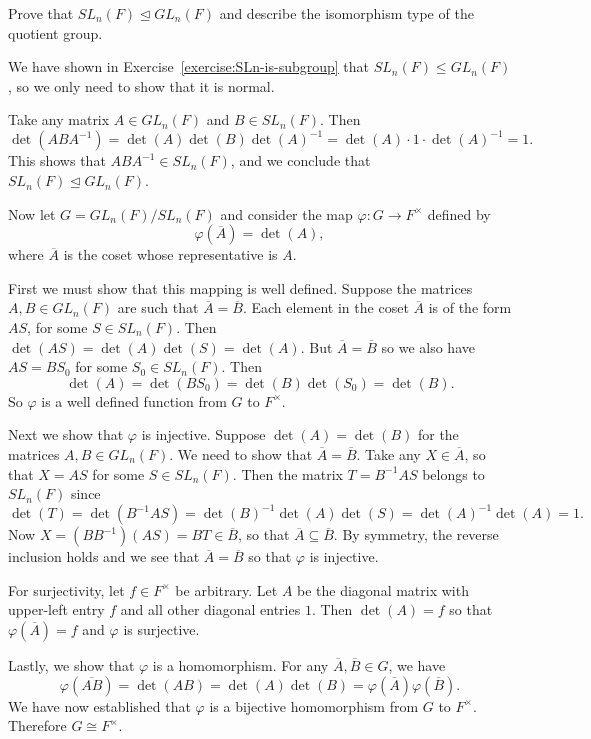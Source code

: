 Prove that $SL_n(F)\trianglelefteq GL_n(F)$ and describe
the isomorphism type of the quotient group.
\begin{solution}
  We have shown in Exercise~\ref{exercise:SLn-is-subgroup} that
  $SL_n(F)\leq GL_n(F)$, so we only need to show that it is normal.

  Take any matrix $A\in GL_n(F)$ and $B\in SL_n(F)$. Then
  \begin{equation*}
    \det(ABA^{-1})
    = \det(A)\det(B)\det(A)^{-1}
    = \det(A)\cdot1\cdot\det(A)^{-1}
    = 1.
  \end{equation*}
  This shows that $ABA^{-1}\in SL_n(F)$, and we conclude that
  $SL_n(F)\trianglelefteq GL_n(F)$.

  Now let $G = GL_n(F)/SL_n(F)$ and consider the map
  $\varphi\colon G\to F^\times$ defined by
  \begin{equation*}
    \varphi(\overline{A}) = \det(A),
  \end{equation*}
  where $\overline{A}$ is the coset whose representative is $A$.

  First we must show that this mapping is well defined. Suppose the
  matrices $A,B\in GL_n(F)$ are such that
  $\overline{A} = \overline{B}$. Each element in the coset
  $\overline{A}$ is of the form $AS$, for some $S\in SL_n(F)$. Then
  $\det(AS) = \det(A)\det(S) = \det(A)$. But
  $\overline{A} = \overline{B}$ so we also have $AS = BS_0$ for some
  $S_0\in SL_n(F)$. Then
  \begin{equation*}
    \det(A) = \det(BS_0) = \det(B)\det(S_0) = \det(B).
  \end{equation*}
  So $\varphi$ is a well defined function from $G$ to $F^\times$.

  Next we show that $\varphi$ is injective. Suppose
  $\det(A) = \det(B)$ for the matrices $A,B\in GL_n(F)$. We need to
  show that $\overline{A} = \overline{B}$. Take any
  $X\in\overline{A}$, so that $X = AS$ for some $S\in SL_n(F)$. Then
  the matrix $T = B^{-1}AS$ belongs to $SL_n(F)$ since
  \begin{equation*}
    \det(T) = \det(B^{-1}AS)
    = \det(B)^{-1}\det(A)\det(S) = \det(A)^{-1}\det(A) = 1.
  \end{equation*}
  Now $X = (BB^{-1})(AS) = BT\in\overline{B}$, so that
  $\overline{A}\subseteq\overline{B}$. By symmetry, the reverse
  inclusion holds and we see that $\overline{A} = \overline{B}$ so
  that $\varphi$ is injective.

  For surjectivity, let $f\in F^\times$ be arbitrary. Let $A$ be the
  diagonal matrix with upper-left entry $f$ and all other diagonal
  entries $1$. Then $\det(A) = f$ so that $\varphi(\overline{A}) = f$
  and $\varphi$ is surjective.

  Lastly, we show that $\varphi$ is a homomorphism. For any
  $\overline{A},\overline{B}\in G$, we have
  \begin{equation*}
    \varphi(\overline{AB})
    = \det(AB)
    = \det(A)\det(B)
    = \varphi(\overline{A})\varphi(\overline{B}).
  \end{equation*}
  We have now established that $\varphi$ is a bijective homomorphism
  from $G$ to $F^\times$. Therefore $G\cong F^\times$.
\end{solution}

